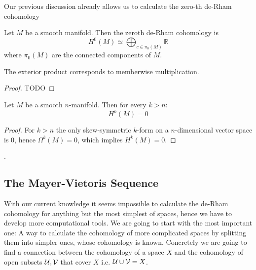Our previous discussion already allows us to calculate the zero-th de-Rham cohomology
\begin{lemma}
Let $M$ be a smooth manifold. Then the zeroth de-Rham cohomology is
\[
	H^0(M) \simeq \bigoplus_{c \in \pi_0(M)} \mathbb{R}
\]
where $\pi_0(M)$ are the connected components of $M$.

The exterior product corresponds to memberwise multiplication.
\end{lemma}
\begin{proof}
TODO
\end{proof}
\begin{lemma}
Let $M$ be a smooth $n$-manifold. Then for every $k > n$:
\[
	H^k(M) = 0
\]
\end{lemma}
\begin{proof}
For $k > n$ the only skew-symmetric $k$-form on a $n$-dimensional vector space is $0$, hence
$\Omega^k(M) = 0$, which implies $H^k(M) = 0$.
\end{proof}.


\subsection{The Mayer-Vietoris Sequence}
With our current knowledge it seems impossible to calculate the de-Rham cohomology for anything but the most simplest of
spaces, hence we have to develop more computational tools. We are going to start with the most important one: A way to
calculate the cohomology of more complicated spaces by splitting them into simpler ones, whose cohomology is known.
Concretely we are going to find a connection between the cohomology of a space $X$ and the cohomology of open subsets $\mathcal{U}, \mathcal{V}$ that cover $X$
i.e. $\mathcal{U} \cup \mathcal{V} = X$.

